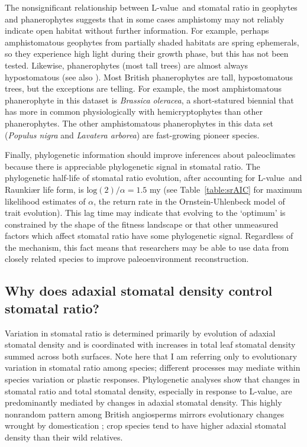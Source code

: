 \documentclass[12pt, oneside]{article}
\newcommand{\el}{L-value}
\begin{document}
The nonsignificant relationship between \el~and stomatal ratio in geophytes and phanerophytes suggests that in some cases amphistomy may not reliably indicate open habitat without further information. For example, perhaps amphistomatous geophytes from partially shaded habitats are spring ephemerals, so they  experience high light during their growth phase, but this has not been tested. Likewise, phanerophytes (most tall trees) are almost always hypostomatous (see also \cite{Muir_2015}). Most British phanerophytes are tall, hypostomatous trees, but the exceptions are telling. For example, the most amphistomatous phanerophyte in this dataset is \textit{Brassica oleracea}, a short-statured biennial that has more in common physiologically with hemicryptophytes than other phanerophytes. The other amphistomatous phanerophytes in this data set (\textit{Populus nigra} and \textit{Lavatera arborea}) are fast-growing pioneer species.

Finally, phylogenetic information should improve inferences about paleoclimates because there is appreciable phylogenetic signal in stomatal ratio. The phylogenetic half-life of stomatal ratio evolution, after accounting for \el~and Raunki\ae r life form, is $\mathrm{log}(2) / \alpha = 1.5$ my (see Table~\ref{table:srAIC} for maximum likelihood estimates of $\alpha$, the return rate in the Ornstein-Uhlenbeck model of trait evolution). This lag time may indicate that evolving to the `optimum' is constrained by the shape of the fitness landscape \citep{Muir_2015} or that other unmeasured factors which affect stomatal ratio have some phylogenetic signal. Regardless of the mechanism, this fact means that researchers may be able to use data from closely related species to improve paleoenvironment reconstruction.

\subsection*{Why does adaxial stomatal density control stomatal ratio?}

Variation in stomatal ratio is determined primarily by evolution of adaxial stomatal density and is coordinated with increases in total leaf stomatal density summed across both surfaces. Note here that I am referring only to evolutionary variation in stomatal ratio among species; different processes may mediate within species variation or plastic responses. Phylogenetic analyses show that changes in stomatal ratio and total stomatal density, especially in response to \el, are predominantly mediated by changes in adaxial stomatal density. This highly nonrandom pattern among British angiosperms mirrors evolutionary changes wrought by domestication \citep{Milla_etal_2013}; crop species tend to have higher adaxial stomatal density than their wild relatives. 
\end{document}
